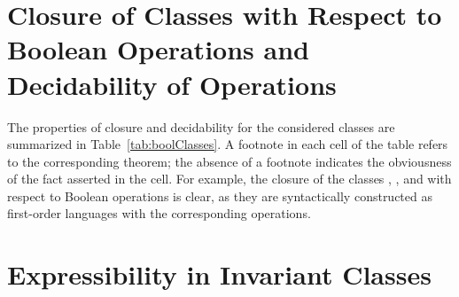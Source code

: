 
\section{Closure of Classes with Respect to Boolean Operations and Decidability of Operations}\label{sec:comparison/boolean}

The properties of closure and decidability for the considered classes are summarized in Table~\cref{tab:boolClasses}. A footnote in each cell of the table refers to the corresponding theorem; the absence of a footnote indicates the obviousness of the fact asserted in the cell. For example, the closure of the classes \elemclass{}, \sizeelemclass{}, and \regelemclass{} with respect to Boolean operations is clear, as they are syntactically constructed as first-order languages with the corresponding operations.


\section{Expressibility in Invariant Classes}\label{sec:comparison/expressivity}

